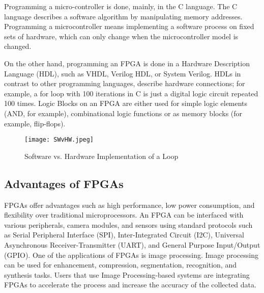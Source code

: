 \par Programming a micro-controller is done, mainly, in the C language. The C language describes a software algorithm by manipulating memory addresses. Programming a microcontroller means implementing a software process on fixed sets of hardware, which can only change when the microcontroller model is changed. \newline

\par On the other hand, programming an FPGA is done in a Hardware Description Language (HDL), such as VHDL, Verilog HDL, or System Verilog. HDLs in contrast to other programming languages, describe hardware connections; for example, a for loop with 100 iterations in C is just a digital logic circuit repeated 100 times. Logic Blocks on an FPGA are either used for simple logic elements (AND, for example), combinational logic functions or as memory blocks (for example, flip-flops).\newline


\begin{figure}[H]
    \centering
    \texttt{[image: SWvHW.jpeg]}
    \caption{Software vs. Hardware Implementation of a Loop}
    \label{fig:loopcompswhw}   
\end{figure}    

\subsection{Advantages of FPGAs}
\par FPGAs offer advantages such as high performance, low power consumption, and flexibility over traditional microprocessors. An FPGA can be interfaced with various peripherals, camera modules, and sensors using standard protocols such as Serial Peripheral Interface (SPI), Inter-Integrated Circuit (I2C), Universal Asynchronous Receiver-Transmitter (UART), and General Purpose Input/Output (GPIO). One of the applications of FPGAs is image processing. Image processing can be used for enhancement, compression, segmentation, recognition, and synthesis tasks. Users that use Image Processing-based systems are integrating FPGAs to accelerate the process and increase the accuracy of the collected data.\newline

